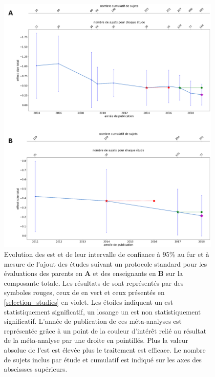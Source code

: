 \begin{figure}[h!]
  \centering
	\includegraphics[width=1\linewidth]{figures/chapter-2/meta-analysis-evolution-summary-effect-std} 
  \caption{Evolution des \gls{est} et de leur intervalle de confiance à 95\% au fur et à mesure de l'ajout des études suivant un protocole standard pour les évaluations des 
	parents en \textbf{A} et des enseignants en \textbf{B} sur la composante totale.
  Les résultats de \citep{Cortese2016} sont représentés par des symboles rouges, ceux de \citet{Bussalb2019clinical} en vert et ceux présentés en \ref{selection_studies} en violet. Les étoiles 
	indiquent un \gls{est} statistiquement significatif, un losange un \gls{est} non statistiquement significatif. L'année de publication de ces méta-analyses est représentée grâce à un point de la couleur 
	d'intérêt relié au résultat de la méta-analyse par une droite en pointillés.
	Plus la valeur absolue de l'\gls{est} est élevée plus le traitement est efficace.
	Le nombre de sujets inclus par étude et cumulatif est indiqué sur les axes des abscissses supérieurs.}
  \label{Figure:meta_analysis_evolution_est_std}
\end{figure}

